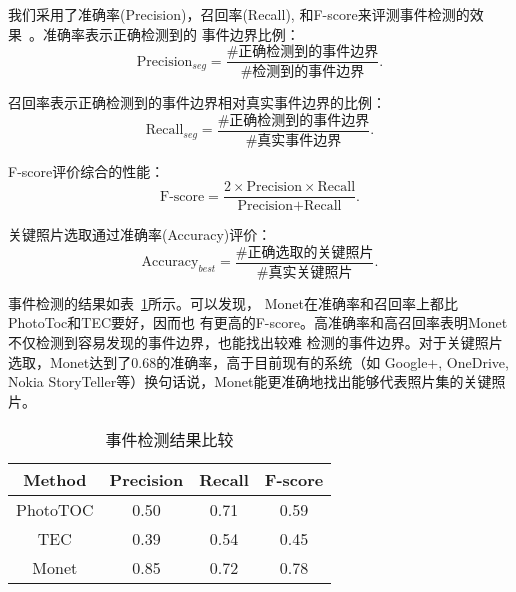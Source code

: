 我们采用了准确率(Precision)，召回率(Recall),
和F-score来评测事件检测的效果~\cite{cooper2005temporal}。准确率表示正确检测到的
事件边界比例：
\begin{equation}
    {\text{Precision}}_{seg}=\frac{\text{\#正确检测到的事件边界}}{\text{\#检测到的事件边界}}.
\end{equation}

召回率表示正确检测到的事件边界相对真实事件边界的比例：
\begin{equation}
    {\text{Recall}}_{seg}=\frac{\text{\#正确检测到的事件边界}}{\text{\#真实事件边界}}.
\end{equation}

F-score评价综合的性能：
\begin{equation}
    \text{F-score}=\frac{2\times \text{Precision} \times \text{Recall}}{\text{Precision} + \text{Recall}}.
\end{equation}

关键照片选取通过准确率(Accuracy)评价：
\begin{equation}
    \text{Accuracy}_{best} =\frac{\text{\#正确选取的关键照片}}{\text{\#真实关键照片}}.
\end{equation}

事件检测的结果如表~\ref{tab:monet-event-seg-res}所示。可以发现，
Monet在准确率和召回率上都比PhotoToc和TEC要好，因而也
有更高的F-score。高准确率和高召回率表明Monet不仅检测到容易发现的事件边界，也能找出较难
检测的事件边界。对于关键照片选取，Monet达到了$0.68$的准确率，高于目前现有的系统（如
Google+, OneDrive, Nokia StoryTeller等）换句话说，Monet能更准确地找出能够代表照片集的关键照片。
\begin{table}[htbp]
    \centering
    \caption{事件检测结果比较}
    \label{tab:monet-event-seg-res}
    \begin{tabular}{|c|c|c|c|}
        \hline
        Method          & Precision     & Recall    & F-score \\
        \hline
        PhotoTOC\cite{platt2003phototoc} & 0.50          & 0.71      & 0.59 \\
        \hline
        TEC\cite{cooper2005temporal}      & 0.39          & 0.54      & 0.45 \\
        \hline
        Monet                    & 0.85     &   0.72    & 0.78 \\
        \hline
    \end{tabular}
\end{table}

